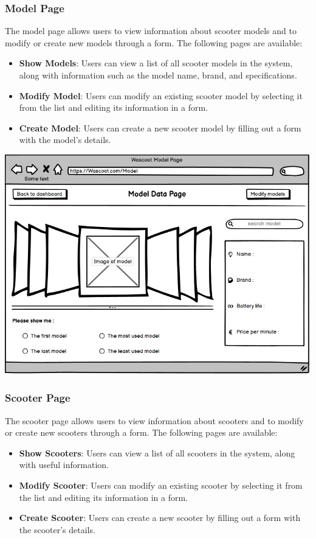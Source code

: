 \subsubsection{Model Page}

The model page allows users to view information about scooter models and to modify or create new models through a form. The following pages are available:

\begin{itemize}
\item \textbf{Show Models}: Users can view a list of all scooter models in the system, along with information such as the model name, brand, and specifications.
\item \textbf{Modify Model}: Users can modify an existing scooter model by selecting it from the list and editing its information in a form.
\item \textbf{Create Model}: Users can create a new scooter model by filling out a form with the model's details.
\end{itemize}

\includegraphics[scale = 0.7]{sections/DLL/model-mockup.png}

\subsubsection{Scooter Page}

The scooter page allows users to view information about scooters and to modify or create new scooters through a form. The following pages are available:

\begin{itemize}
\item \textbf{Show Scooters}: Users can view a list of all scooters in the system, along with useful information.
\item \textbf{Modify Scooter}: Users can modify an existing scooter by selecting it from the list and editing its information in a form.
\item \textbf{Create Scooter}: Users can create a new scooter by filling out a form with the scooter's details.
\end{itemize}

